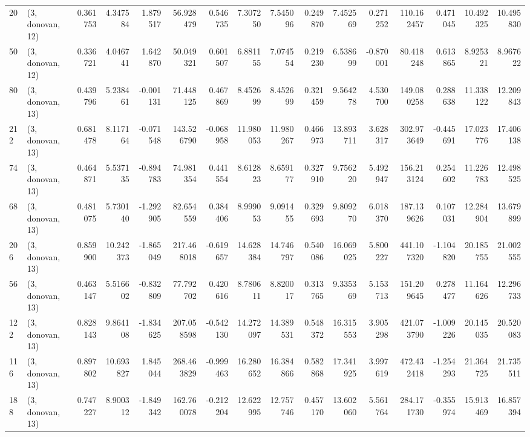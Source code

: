 \begin{tabular}{llrrrrrrrrrrrrrr}
20  &  (3, donovan, 12) &   0.361753 &   4.347584 &   1.879517 &    56.928479 &   0.546735 &   7.307250 &   7.545096 &  0.249870 &   7.452569 &   0.271252 &   110.162457 &   0.471045 &  10.492325 &  10.495830 \\
50  &  (3, donovan, 12) &   0.336721 &   4.046741 &   1.642870 &    50.049321 &   0.601507 &   6.881155 &   7.074554 &  0.219230 &   6.538699 &  -0.870001 &    80.418248 &   0.613865 &   8.925321 &   8.967622 \\
80  &  (3, donovan, 13) &   0.439796 &   5.238461 &  -0.001131 &    71.448125 &   0.467869 &   8.452699 &   8.452699 &  0.321459 &   9.564278 &   4.530700 &   149.080258 &   0.288638 &  11.338122 &  12.209843 \\
212 &  (3, donovan, 13) &   0.681478 &   8.117164 &  -0.071548 &   143.526790 &  -0.068958 &  11.980053 &  11.980267 &  0.466973 &  13.893711 &   3.628317 &   302.973649 &  -0.445691 &  17.023776 &  17.406138 \\
74  &  (3, donovan, 13) &   0.464871 &   5.537135 &  -0.894783 &    74.981354 &   0.441554 &   8.612823 &   8.659177 &  0.327910 &   9.756220 &   5.492947 &   156.213124 &   0.254602 &  11.226783 &  12.498525 \\
68  &  (3, donovan, 13) &   0.481075 &   5.730140 &  -1.292905 &    82.654559 &   0.384406 &   8.999053 &   9.091455 &  0.329693 &   9.809270 &   6.018370 &   187.139626 &   0.107031 &  12.284904 &  13.679899 \\
206 &  (3, donovan, 13) &   0.859900 &  10.242373 &  -1.865049 &   217.468018 &  -0.619657 &  14.628384 &  14.746797 &  0.540086 &  16.069025 &   5.800227 &   441.107320 &  -1.104820 &  20.185755 &  21.002555 \\
56  &  (3, donovan, 13) &   0.463147 &   5.516602 &  -0.832809 &    77.792702 &   0.420616 &   8.780611 &   8.820017 &  0.313765 &   9.335369 &   5.153713 &   151.209645 &   0.278477 &  11.164626 &  12.296733 \\
122 &  (3, donovan, 13) &   0.828143 &   9.864108 &  -1.834625 &   207.058598 &  -0.542130 &  14.272097 &  14.389531 &  0.548372 &  16.315553 &   3.905298 &   421.073790 &  -1.009226 &  20.145035 &  20.520083 \\
116 &  (3, donovan, 13) &   0.897802 &  10.693827 &   1.845044 &   268.463829 &  -0.999463 &  16.280652 &  16.384866 &  0.582868 &  17.341925 &   3.997619 &   472.432418 &  -1.254293 &  21.364725 &  21.735511 \\
188 &  (3, donovan, 13) &   0.747227 &   8.900312 &  -1.849342 &   162.760078 &  -0.212204 &  12.622995 &  12.757746 &  0.457170 &  13.602060 &   5.561764 &   284.171730 &  -0.355974 &  15.913469 &  16.857394 \\

\end{tabular}
